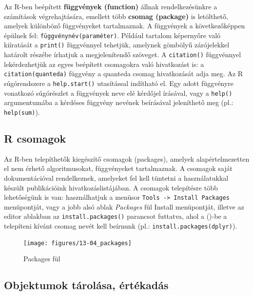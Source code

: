 \documentclass[
]{book}
\begin{document}
Az R-ben beépített \textbf{függvények (function)} állnak
rendelkezésünkre a számítások végrehajtására, emellett több
\textbf{csomag (package)} is letölthető, amelyek különböző függvényeket
tartalmaznak. A függvények a következőképpen épülnek fel:
\texttt{függvénynév(paraméter)}. Például tartalom képernyőre való
kiíratását a \texttt{print()} függvénnyel tehetjük, amelynek gömbölyű
zárójelekkel határolt részébe írhatjuk a megjelenítendő szöveget. A
\texttt{citation()} függvénnyel lekérdezhetjük az egyes beépített
csomagokra való hivatkozást is: a \texttt{citation(quanteda)} függvény a
quanteda csomag hivatkozását adja meg. Az R súgórendszere a
\texttt{help.start()} utasítással indítható el. Egy adott függvényre
vonatkozó súgórészlet a függvények neve elé kérdőjel írásával, vagy a
\texttt{help()} argumentumába a kérdéses függvény nevének beírásával
jeleníthető meg (pl.: \texttt{help(sum)}).

\hypertarget{packages}{%
\subsection{R csomagok}\label{packages}}

Az R-ben telepíthetők kiegészítő csomagok (packages), amelyek
alapértelmezetten el nem érhető algoritmusokat, függvényeket
tartalmaznak. A csomagok saját dokumentációval rendelkeznek, amelyeket
fel kell tüntetni a használatukkal készült publikációink
hivatkozáslistájában. A csomagok telepítésre több lehetőségünk is van:
használhatjuk a menüsor
\texttt{Tools\ -\textgreater{}\ Install\ Packages} menüpontját, vagy a
jobb alsó ablak \emph{Packages} fül Install menüpontját, illetve az
editor ablakban az \texttt{install.packages()} parancsot futtatva, ahol
a ()-be a telepíteni kívánt csomag nevét kell beírnunk (pl.:
\texttt{install.packages(dplyr)}).

\begin{figure}

{\centering \texttt{[image: figures/13-04\_packages]} 

}

\caption{Packages fül}\label{fig:unnamed-chunk-108}
\end{figure}

\hypertarget{objektumok-tuxe1roluxe1sa-uxe9rtuxe9kaduxe1s}{%
\subsection{Objektumok tárolása,
értékadás}\label{objektumok-tuxe1roluxe1sa-uxe9rtuxe9kaduxe1s}}
\end{document}
